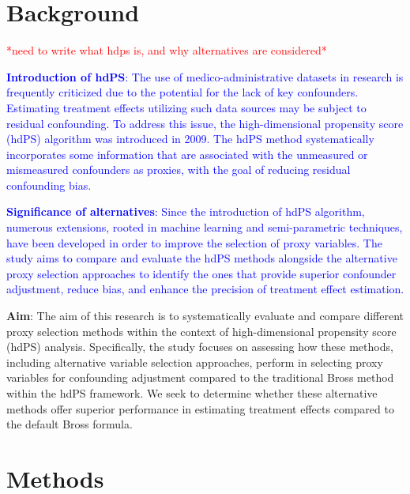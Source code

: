 \documentclass[sn-vancouver,Numbered,lineno,pdflatex]{sn-jnl}
\begin{document}

\maketitle

\section{Background}\label{background}

\textcolor{red}{*need to write what hdps is, and why alternatives are considered*}

\textcolor{blue}{\textbf{Introduction of hdPS}: The use of medico-administrative datasets in research is frequently criticized due to the potential for the lack of key confounders. Estimating treatment effects utilizing such data sources may be subject to residual confounding. To address this issue, the high-dimensional propensity score (hdPS) algorithm was introduced in 2009. The hdPS method systematically incorporates some information that are associated with the unmeasured or mismeasured confounders as proxies, with the goal of reducing residual confounding bias.}

\textcolor{blue}{\textbf{Significance of alternatives}: Since the introduction of hdPS algorithm, numerous extensions, rooted in machine learning and semi-parametric techniques, have been developed in order to improve the selection of proxy variables. The study aims to compare and evaluate the hdPS methods alongside the alternative proxy selection approaches to identify the ones that provide superior confounder adjustment, reduce bias, and enhance the precision of treatment effect estimation.}

\textbf{Aim}: The aim of this research is to systematically evaluate and
compare different proxy selection methods within the context of
high-dimensional propensity score (hdPS) analysis. Specifically, the
study focuses on assessing how these methods, including alternative
variable selection approaches, perform in selecting proxy variables for
confounding adjustment compared to the traditional Bross method within
the hdPS framework. We seek to determine whether these alternative
methods offer superior performance in estimating treatment effects
compared to the default Bross formula.

\section{Methods}\label{methods}
\end{document}
